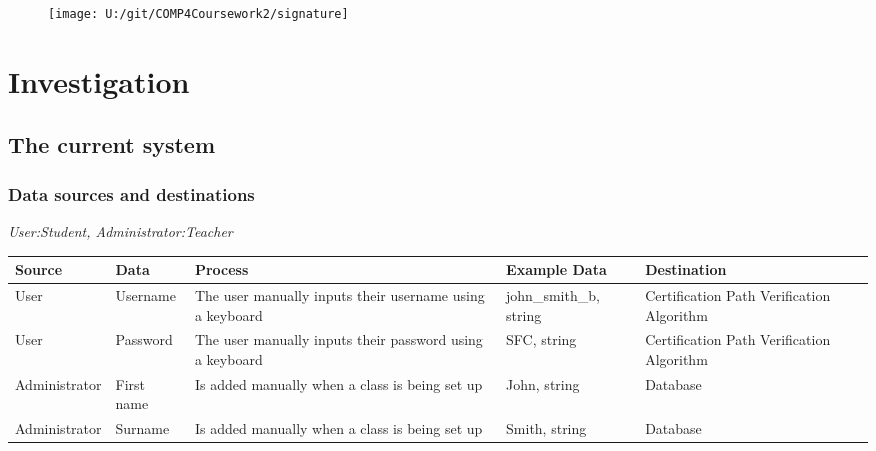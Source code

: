 \begin{figure}[H]
    \texttt{[image: U:/git/COMP4Coursework2/signature]}
\end{figure}

\section{Investigation}

\subsection{The current system}

\subsubsection{Data sources and destinations}

\textit{User:Student, Administrator:Teacher}

\begin{center}
\begin{tabular}{|p{2.5cm}|p{2.5cm}|p{2.5cm}|p{2.5cm}|p{2.5cm}|}
\hline
\textbf{Source} & \textbf{Data} & \textbf{Process} & \textbf{Example Data} & \textbf{Destination} \\ \hline
User & Username & The user manually inputs their username using a keyboard & john\_smith\_b, string & Certification Path Verification Algorithm \\ \hline
User & Password & The user manually inputs their password using a keyboard & SFC, string & Certification Path Verification Algorithm \\ \hline
Administrator & First name & Is added manually when a class is being set up & John, string & Database \\ \hline
Administrator & Surname & Is added manually when a class is being set up & Smith, string & Database \\ \hline
\end{tabular}
\end{center}

